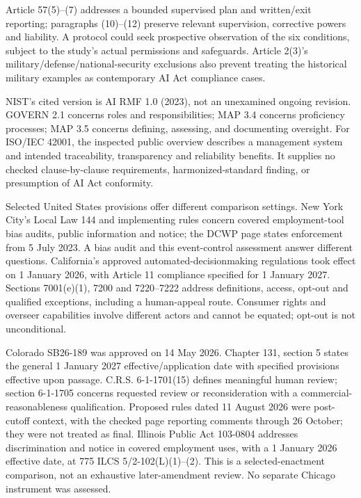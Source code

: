 \documentclass[11pt]{article}
\begin{document}
Article 57(5)--(7) addresses a bounded supervised plan and written/exit reporting; paragraphs (10)--(12) preserve relevant supervision, corrective powers and liability. A protocol could seek prospective observation of the six conditions, subject to the study's actual permissions and safeguards. Article 2(3)'s military/defense/national-security exclusions also prevent treating the historical military examples as contemporary AI Act compliance cases.

NIST's cited version is AI RMF 1.0 (2023), not an unexamined ongoing revision. GOVERN 2.1 concerns roles and responsibilities; MAP 3.4 concerns proficiency processes; MAP 3.5 concerns defining, assessing, and documenting oversight. For ISO/IEC 42001, the inspected public overview describes a management system and intended traceability, transparency and reliability benefits. It supplies no checked clause-by-clause requirements, harmonized-standard finding, or presumption of AI Act conformity.

Selected United States provisions offer different comparison settings. New York City's Local Law 144 and implementing rules concern covered employment-tool bias audits, public information and notice; the DCWP page states enforcement from 5 July 2023. A bias audit and this event-control assessment answer different questions. California's approved automated-decisionmaking regulations took effect on 1 January 2026, with Article 11 compliance specified for 1 January 2027. Sections 7001(e)(1), 7200 and 7220--7222 address definitions, access, opt-out and qualified exceptions, including a human-appeal route. Consumer rights and overseer capabilities involve different actors and cannot be equated; opt-out is not unconditional.

Colorado SB26-189 was approved on 14 May 2026. Chapter 131, section 5 states the general 1 January 2027 effective/application date with specified provisions effective upon passage. C.R.S. 6-1-1701(15) defines meaningful human review; section 6-1-1705 concerns requested review or reconsideration with a commercial-reasonableness qualification. Proposed rules dated 11 August 2026 were post-cutoff context, with the checked page reporting comments through 26 October; they were not treated as final. Illinois Public Act 103-0804 addresses discrimination and notice in covered employment uses, with a 1 January 2026 effective date, at 775 ILCS 5/2-102(L)(1)--(2). This is a selected-enactment comparison, not an exhaustive later-amendment review. No separate Chicago instrument was assessed.
\end{document}

